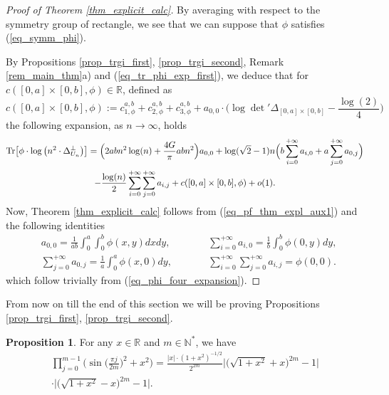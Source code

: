 \documentclass[12pt]{article}
\numberwithin{equation}{section}
\theoremstyle{theorem}
\theoremstyle{definition}
\newtheorem{prop}[thm]{Proposition}
\theoremstyle{remark}
\newcommand{\real}{\mathbb{R}}
\newcommand{\nat}{\mathbb{N}}
\newcommand{\laplcomp}{\Delta}
\newcommand{\tr}[1]{{\rm{Tr}} \big[ #1 \big]}
\begin{document}
		\begin{proof}[Proof of Theorem \ref{thm_explicit_calc}]
			By averaging with respect to the symmetry group of rectangle, we see that we can suppose that $\phi$ satisfies (\ref{eq_symm_phi}).
			\par 
			By Propositions \ref{prop_trgi_first}, \ref{prop_trgi_second}, Remark \ref{rem_main_thm}a) and (\ref{eq_tr_phi_exp_first}), we deduce that for $c([0, a] \times [0, b], \phi) \in \real$, defined as 
			\begin{equation}
				c([0, a] \times [0, b], \phi)  := c_{1, \phi}^{a, b} + c_{2, \phi}^{a, b}  + c_{3, \phi}^{a, b} + a_{0, 0} \cdot 
				\Big(
					\log \det{}' \Delta_{[0, a] \times [0, b]}
					-
					\frac{\log(2)}{4}
				\Big)
			\end{equation}
			the following expansion, as $n \to \infty$, holds
			\begin{multline}\label{eq_pf_thm_expl_aux1}
				\tr{ \phi \cdot \log \big( n^2\cdot \laplcomp_{U_{n}}^{\perp} \big)}
				= 
				\Big(
				2 ab n^2 \log(n) + 
				\frac{4G}{\pi} abn^2
				\Big)
				a_{0, 0}
				+ 
				\log(\sqrt{2} - 1) n  
				\Big( 
					b \sum_{i = 0}^{+ \infty} a_{i, 0}
					+
					a \sum_{j = 0}^{+ \infty} a_{0, j}
				\Big)				
				\\
				-
				\frac{\log(n)}{2} \sum_{i = 0}^{+ \infty} \sum_{j = 0}^{+ \infty} a_{i, j}
				+ 
				c([0, a] \times [0, b], \phi)  + o(1).
			\end{multline}
			Now, Theorem \ref{thm_explicit_calc} follows from (\ref{eq_pf_thm_expl_aux1}) and the following identities
			\begin{equation}
			\begin{aligned}
				&
				a_{0, 0} 
				= 
				\frac{1}{ab} \int_{0}^{a} \int_{0}^{b} \phi(x, y) dx dy,
				\qquad
				&&
				\sum_{i = 0}^{+ \infty} a_{i, 0}
				=
				\frac{1}{b} \int_{0}^{b} \phi(0, y) dy ,
				\\
				&
				\sum_{j = 0}^{+ \infty} a_{0, j}
				=
				\frac{1}{a} \int_{0}^{a} \phi(x, 0) dy ,
				\qquad
				&&
				\sum_{i = 0}^{+ \infty} \sum_{j = 0}^{+ \infty} a_{i, j}
				=
				\phi(0, 0).
			\end{aligned}
			\end{equation}
			which follow trivially from (\ref{eq_phi_four_expansion}).
		\end{proof}
		\par
		From now on till the end of this section we will be proving Propositions \ref{prop_trgi_first}, \ref{prop_trgi_second}.
		\begin{prop}\label{prod_prod_sin}
			For any $x \in \real$ and $m \in \nat^*$, we have
			\begin{multline}
				\prod_{j = 0}^{m-1} \Big( \sin \Big( \frac{\pi j }{2m} \Big)^2 + x^2 \Big)
				=
				\frac{|x| 
				\cdot
				(1 + x^2)^{-1/2}}{2^{2m}}
				\Big|
					\big( 
						 \sqrt{1 + x^2} + x
					\big)^{2m}
					-
					1
				\Big|
				\\
				\cdot
				\Big|
					\big( 
						\sqrt{1 + x^2} - x
					\big)^{2m}
					-
					1
				\Big|.
			\end{multline}
		\end{prop}
\end{document}
